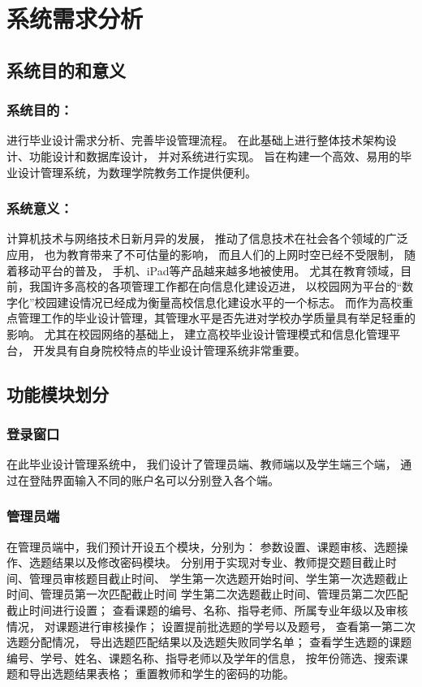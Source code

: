 \section{系统需求分析}

\subsection{系统目的和意义}

\subsubsection{系统目的：}
进行毕业设计需求分析、完善毕设管理流程。
在此基础上进行整体技术架构设计、功能设计和数据库设计，
并对系统进行实现。
旨在构建一个高效、易用的毕业设计管理系统，为数理学院教务工作提供便利。

\subsubsection{系统意义：}
计算机技术与网络技术日新月异的发展，
推动了信息技术在社会各个领域的广泛应用，
也为教育带来了不可估量的影响，
而且人们的上网时空已经不受限制，
随着移动平台的普及，
手机、iPad等产品越来越多地被使用。
尤其在教育领域，目前，我国许多高校的各项管理工作都在向信息化建设迈进，
以校园网为平台的“数字化”校园建设情况已经成为衡量高校信息化建设水平的一个标志。
而作为高校重点管理工作的毕业设计管理，其管理水平是否先进对学校办学质量具有举足轻重的影响。
尤其在校园网络的基础上，
建立高校毕业设计管理模式和信息化管理平台，
开发具有自身院校特点的毕业设计管理系统非常重要。


\subsection{功能模块划分}

\subsubsection{登录窗口}
在此毕业设计管理系统中，
我们设计了管理员端、教师端以及学生端三个端，
通过在登陆界面输入不同的账户名可以分别登入各个端。

\subsubsection{管理员端}
在管理员端中，我们预计开设五个模块，分别为：
参数设置、课题审核、选题操作、选题结果以及修改密码模块。
分别用于实现对专业、教师提交题目截止时间、管理员审核题目截止时间、
学生第一次选题开始时间、学生第一次选题截止时间、管理员第一次匹配截止时间
学生第二次选题截止时间、管理员第二次匹配截止时间进行设置；
查看课题的编号、名称、指导老师、所属专业年级以及审核情况，
对课题进行审核操作；
设置提前批选题的学号以及题号，
查看第一第二次选题分配情况，
导出选题匹配结果以及选题失败同学名单；
查看学生选题的课题编号、学号、姓名、课题名称、指导老师以及学年的信息，
按年份筛选、搜索课题和导出选题结果表格；
重置教师和学生的密码的功能。

